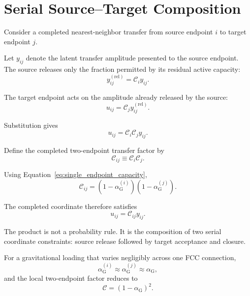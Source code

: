 \section{Serial Source--Target Composition}
\label{sec:grav_serial_composition}

Consider a completed nearest-neighbor transfer from source endpoint $i$ to target endpoint $j$.

Let $y_{ij}$ denote the latent transfer amplitude presented to the source endpoint. The source releases only the fraction permitted by its residual active capacity:
\begin{equation}
    y_{ij}^{(\mathrm{rel})} = \mathcal{C}_{i}y_{ij}.
\end{equation}

The target endpoint acts on the amplitude already released by the source:
\begin{equation}
    u_{ij} = \mathcal{C}_{j}y_{ij}^{(\mathrm{rel})}.
\end{equation}

Substitution gives
\begin{equation}
    u_{ij} = \mathcal{C}_{i}\mathcal{C}_{j}y_{ij}.
\end{equation}

Define the completed two-endpoint transfer factor by
\begin{equation}
    \mathcal{C}_{ij} \equiv \mathcal{C}_{i}\mathcal{C}_{j}.
    \label{eq:two_endpoint_factor}
\end{equation}

Using Equation~\eqref{eq:single_endpoint_capacity},
\begin{equation}
    \mathcal{C}_{ij} = \left( 1-\alpha_{\mathrm{G}}^{(i)} \right) \left( 1-\alpha_{\mathrm{G}}^{(j)} \right).
    \label{eq:gravity_endpoint_product}
\end{equation}

The completed coordinate therefore satisfies
\begin{equation}
    u_{ij} = \mathcal{C}_{ij}y_{ij}.
    \label{eq:two_endpoint_coordinate_map}
\end{equation}

The product is not a probability rule. It is the composition of two serial coordinate constraints: source release followed by target acceptance and closure.

For a gravitational loading that varies negligibly across one FCC connection,
\begin{equation}
    \alpha_{\mathrm{G}}^{(i)} \approx \alpha_{\mathrm{G}}^{(j)} \approx \alpha_{\mathrm{G}},
\end{equation}
and the local two-endpoint factor reduces to
\begin{equation}
    \mathcal{C} = \left( 1-\alpha_{\mathrm{G}} \right)^2.
    \label{eq:uniform_two_endpoint_factor}
\end{equation}

